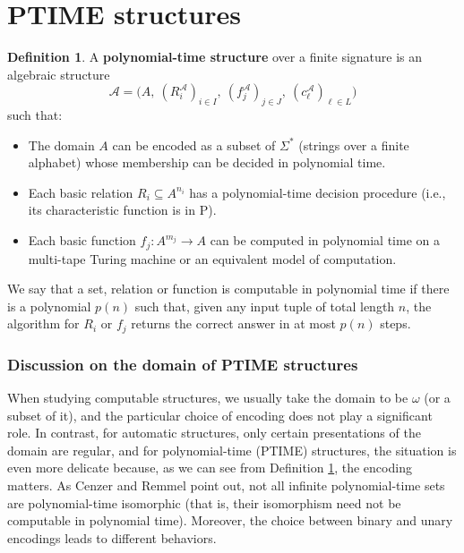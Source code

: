 \documentclass{pracalicmgr2025}
\theoremstyle{plain}            %
\theoremstyle{remark}           %
\theoremstyle{definition}       %
\newtheorem{definition}[theorem]{Definition}
\begin{document}
\section{PTIME structures}

    
\begin{definition}\label{PTIME str}
A \textbf{polynomial-time structure} over a finite signature is an algebraic structure 
$$
\mathcal{A} = \bigl(A,\ (R_i^{\mathcal{A}})_{i \in I},\ (f_j^{\mathcal{A}})_{j \in J},\ (c_\ell^{\mathcal{A}})_{\ell \in L}\bigr)
$$
such that:

\begin{itemize}
    \item The domain $A$ can be encoded as a subset of $\Sigma^*$ (strings over a finite alphabet) whose membership can be decided in polynomial time.
    \item Each basic relation $R_i \subseteq A^{n_i}$ has a polynomial-time decision procedure (i.e., its characteristic function is in P).
    \item Each basic function $f_j: A^{m_j} \to A$ can be computed in polynomial time on a multi-tape Turing machine or an equivalent model of computation.
\end{itemize}
\end{definition}


 We say that a set, relation or function is computable in polynomial time if there is a polynomial $p(n)$ such that, given any input tuple of total length $n$, the algorithm for $R_i$ or $f_j$ returns the correct answer in at most $p(n)$ steps.
\subsubsection{Discussion on the domain of PTIME structures}

When studying computable structures, we usually take the domain to be $\omega$ (or a subset of it), and the particular choice of encoding does not play a significant role. In contrast, for automatic structures, only certain presentations of the domain are regular, and for polynomial-time (PTIME) structures, the situation is even more delicate because, as we can see from Definition \ref{PTIME str}, the encoding matters. As Cenzer and Remmel \cite{CENZER199117} point out, not all infinite polynomial-time sets are polynomial-time isomorphic (that is, their isomorphism need not be computable in polynomial time). Moreover, the choice between binary and unary encodings leads to different behaviors.
\end{document}
